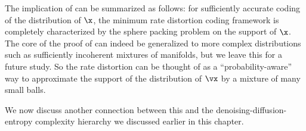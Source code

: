 \documentclass[../../book-main.tex]{subfiles}
\begin{document}
The implication of  can be summarized
as follows: for sufficiently accurate coding of the distribution of
$\x$, the minimum rate distortion coding framework is completely characterized
by the sphere packing problem on the support of $\x$. 
The core of the proof of  can indeed
be generalized to more complex distributions such as sufficiently incoherent
mixtures of manifolds, but we leave this for a future study.
So the rate distortion can be thought of as a ``probability-aware'' way to
approximate the support of the distribution of
\(\vx\) by a mixture of many small balls.

We now discuss another connection between this and the
denoising-diffusion-entropy complexity hierarchy we discussed earlier in this
chapter.
\end{document}
